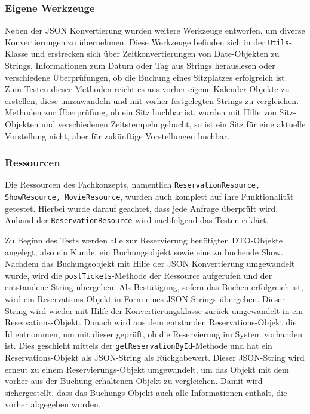 \subsubsection{Eigene Werkzeuge}

Neben der \acs{JSON} Konvertierung wurden weitere Werkzeuge entworfen, um diverse Konvertierungen zu übernehmen.
Diese Werkzeuge befinden sich in der \texttt{Utils}-Klasse und erstrecken sich über Zeitkonvertierungen von Date-Objekten zu Strings, Informationen zum Datum oder Tag aus Strings herauslesen oder verschiedene Überprüfungen, ob die Buchung eines Sitzplatzes erfolgreich ist.
Zum Testen dieser Methoden reicht es aus vorher eigene Kalender-Objekte zu erstellen, diese umzuwandeln und mit vorher festgelegten Strings zu vergleichen.
Methoden zur Überprüfung, ob ein Sitz buchbar ist, wurden mit Hilfe von Sitz-Objekten und verschiedenen Zeitstempeln gebucht, so ist ein Sitz für eine aktuelle Vorstellung nicht, aber für zukünftige Vorstellungen buchbar.

\subsubsection{Ressourcen}
Die Ressourcen des Fachkonzepts, namentlich \texttt{ReservationResource, ShowResource, MovieResource}, wurden auch komplett auf ihre Funktionalität getestet.
Hierbei wurde darauf geachtet, dass jede Anfrage überprüft wird. Anhand der \texttt{ReservationResource} wird nachfolgend das Testen erklärt.

Zu Beginn des Tests werden alle zur Reservierung benötigten \acs{DTO}-Objekte angelegt, also ein Kunde, ein Buchungsobjekt sowie eine zu buchende Show.
Nachdem das Buchungsobjekt mit Hilfe der \acs{JSON} Konvertierung umgewandelt wurde, wird die \texttt{postTickets}-Methode der Ressource aufgerufen und der entstandene String übergeben.
Als Bestätigung, sofern das Buchen erfolgreich ist, wird ein Reservations-Objekt in Form eines \acs{JSON}-Strings übergeben. Dieser String wird wieder mit Hilfe der Konvertierungsklasse zurück umgewandelt in ein Reservations-Objekt.
Danach wird aus dem entstanden Reservations-Objekt die Id entnommen, um mit dieser geprüft, ob die Reservierung im System vorhanden ist. Dies geschieht mittels der \texttt{getReservationById}-Methode und hat ein Reservations-Objekt als \acs{JSON}-String als Rückgabewert.
Dieser \acs{JSON}-String wird erneut zu einem Reservierungs-Objekt umgewandelt, um das Objekt mit dem vorher aus der Buchung erhaltenen Objekt zu vergleichen. Damit wird sichergestellt, dass das Buchungs-Objekt auch alle Informationen enthält, die vorher abgegeben wurden.

